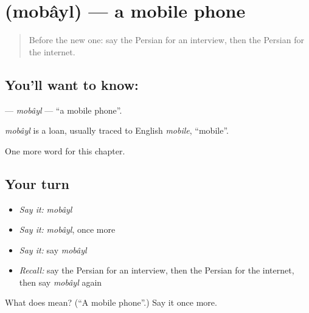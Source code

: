 \section[\texorpdfstring{\fa{موبایل} (mobâyl)}{موبایل (mobâyl)}]{ (mobâyl) — a mobile phone}

\label{lesson:FA-C210-mobayl}



\begin{quote}
Before the new one: say the Persian for an interview, then the Persian for the internet.
\end{quote}

\subsection*{You'll want to know: }
\textbf{} — \emph{mobâyl} — \textquotedblleft{}a mobile phone\textquotedblright{}.

\begin{cousinweb}
\emph{mobâyl} is a loan, usually traced to English \emph{mobile}, \textquotedblleft{}mobile\textquotedblright{}.
\end{cousinweb}

\begin{grammarlens}[title={What you've built}]
One more word for this chapter.
\end{grammarlens}

\subsection*{Your turn}
\begin{itemize}
\raggedright
  \item \emph{Say it:} \emph{mobâyl}
  \item \emph{Say it:} \emph{mobâyl}, once more
  \item \emph{Say it:} say \emph{mobâyl}
  \item \emph{Recall:} say the Persian for an interview, then the Persian for the internet, then say \emph{mobâyl} again
\end{itemize}

\begin{tcolorbox}[breakable,colback=teal!4,colframe=teal!35!black,title={Before you move on}]
What does  mean? (\textquotedblleft{}A mobile phone\textquotedblright{}.) Say it once more.
\end{tcolorbox}
